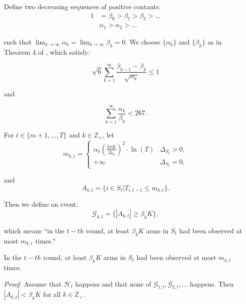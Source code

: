 \documentclass[opre,sglanonrev]{informs4}
\begin{document}
Define two decreasing sequences of positive contants:
$$\begin{aligned}
1 & =\beta_0>\beta_1>\beta_2>\ldots \\
 & \alpha_1>\alpha_2>\ldots
\end{aligned}$$

such that $\lim_{k \to \infty}\alpha_k = \lim_{k \to \infty}\beta_k=0$. We choose $\{\alpha_k\}$ and $\{\beta_k\}$ as in Theorem 4 of \citep{Kveton2014TightRB}, which satisfy:

\begin{equation}\sqrt{6}\sum_{k=1}^\infty\frac{\beta_{k-1}-\beta_k}{\sqrt{\alpha_k}}\leq1\end{equation}

and

\begin{equation}\sum_{k=1}^\infty\frac{\alpha_k}{\beta_k}<267.\end{equation}

For $t \in \{m+1,...,T\}$ and $k \in \mathbb{Z}_+$, let
$$m_{k,t}=
\begin{cases}
\alpha_k\left(\frac{2\sigma K}{\Delta_{S_t}}\right)^2\cdot \ln(T) & \Delta_{S_t}>0, \\
+\infty & \Delta_{S_t}=0,
\end{cases}$$

and 
$$ A_{k,t} = \{i \in S_t|T_{i,t-1}\leq m_{k,t}\}.$$

Then we define an event:
$$\mathcal{G}_{k,t}=\{|A_{k,t}|\geq\beta_kK\},$$

which means “in the $t-th$ round, at least $\beta_{k}K$ arms in $S_{t}$ had been observed at most $m_{k,t}$ times."

\begin{lemma}
In the $t-th$ round, at least $\beta_{k}K$ arms in $S_t$ had been observed at most $m_{k,t}$ times.
\end{lemma}

\textit{Proof.} Assume that $\mathcal{H}_t$ happens and that none of $\mathcal{G}_{1,t},\mathcal{G}_{2,t},...$ happens. Then $|A_{k,t}|<\beta_{k}K$ for all $k\in \mathbb{Z}_+$.
\end{document}
